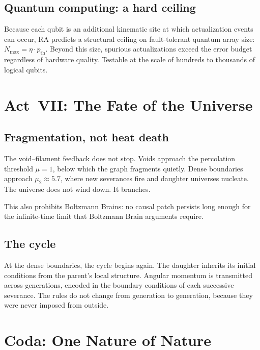 \documentclass[11pt,a4paper]{article}
\theoremstyle{plain}
\theoremstyle{definition}
\theoremstyle{remark}
\begin{document}
\subsection{Quantum computing: a hard ceiling}\label{sec:qc}

Because each qubit is an additional kinematic site at which actualization
events can occur, RA predicts a structural ceiling on fault-tolerant
quantum array size: $N_{\max} = \eta \cdot p_{\mathrm{th}}$.  Beyond this
size, spurious actualizations exceed the error budget regardless of
hardware quality.  Testable at the scale of hundreds to thousands of
logical qubits.

\section{Act~VII: The Fate of the Universe}\label{sec:act7}

\subsection{Fragmentation, not heat death}\label{sec:fragmentation}

The void--filament feedback does not stop.  Voids approach the
percolation threshold $\mu = 1$, below which the graph fragments
quietly.  Dense boundaries approach $\mu_2 \approx 5.7$, where new
severances fire and daughter universes nucleate.  The universe does not
wind down.  It branches.

This also prohibits Boltzmann Brains: no causal patch persists long
enough for the infinite-time limit that Boltzmann Brain arguments require.

\subsection{The cycle}\label{sec:cycle}

At the dense boundaries, the cycle begins again.  The daughter inherits
its initial conditions from the parent's local structure.  Angular
momentum is transmitted across generations, encoded in the boundary
conditions of each successive severance.  The rules do not change from
generation to generation, because they were never imposed from outside.

\section*{Coda: One Nature of Nature}\label{sec:coda}
\end{document}

